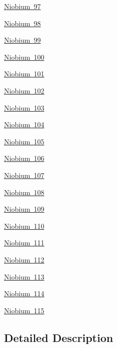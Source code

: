 \begin{DoxyCompactItemize}
\item 
\mbox{\hyperlink{group___isotope_const-_niobium-_nb97}{Niobium 97}}
\item 
\mbox{\hyperlink{group___isotope_const-_niobium-_nb98}{Niobium 98}}
\item 
\mbox{\hyperlink{group___isotope_const-_niobium-_nb99}{Niobium 99}}
\item 
\mbox{\hyperlink{group___isotope_const-_niobium-_nb100}{Niobium 100}}
\item 
\mbox{\hyperlink{group___isotope_const-_niobium-_nb101}{Niobium 101}}
\item 
\mbox{\hyperlink{group___isotope_const-_niobium-_nb102}{Niobium 102}}
\item 
\mbox{\hyperlink{group___isotope_const-_niobium-_nb103}{Niobium 103}}
\item 
\mbox{\hyperlink{group___isotope_const-_niobium-_nb104}{Niobium 104}}
\item 
\mbox{\hyperlink{group___isotope_const-_niobium-_nb105}{Niobium 105}}
\item 
\mbox{\hyperlink{group___isotope_const-_niobium-_nb106}{Niobium 106}}
\item 
\mbox{\hyperlink{group___isotope_const-_niobium-_nb107}{Niobium 107}}
\item 
\mbox{\hyperlink{group___isotope_const-_niobium-_nb108}{Niobium 108}}
\item 
\mbox{\hyperlink{group___isotope_const-_niobium-_nb109}{Niobium 109}}
\item 
\mbox{\hyperlink{group___isotope_const-_niobium-_nb110}{Niobium 110}}
\item 
\mbox{\hyperlink{group___isotope_const-_niobium-_nb111}{Niobium 111}}
\item 
\mbox{\hyperlink{group___isotope_const-_niobium-_nb112}{Niobium 112}}
\item 
\mbox{\hyperlink{group___isotope_const-_niobium-_nb113}{Niobium 113}}
\item 
\mbox{\hyperlink{group___isotope_const-_niobium-_nb114}{Niobium 114}}
\item 
\mbox{\hyperlink{group___isotope_const-_niobium-_nb115}{Niobium 115}}
\end{DoxyCompactItemize}


\subsection{Detailed Description}
